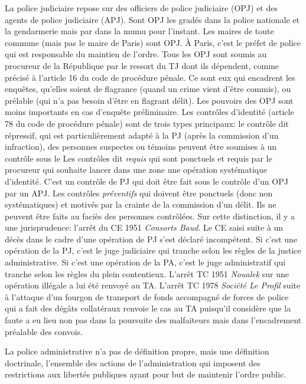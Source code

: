 \documentclass[math]{cours}
\begin{document}
La police judiciaire repose sur des officiers de police judiciaire (OPJ) et des agents de police judiciaire (APJ).
Sont OPJ les gradés dans la police nationale et la gendarmerie mais par dans la mumu pour l'instant.
Les maires de toute commune (mais pas le maire de Paris) sont OPJ. À Paris, c'est le préfet de police qui est responsable du maintien de l'ordre.
Tous les OPJ sont soumis au procureur de la République par le ressort du TJ dont ils dépendent, comme précisé à l'article 16 du code de procédure pénale.
Ce sont eux qui encadrent les enquêtes, qu'elles soient de flagrance (quand un crime vient d'être commis), ou prélable (qui n'a pas besoin d'être en flagrant délit).
Les pouvoirs des OPJ sont moins importants en cas d'enquête préliminaire.
Les contrôles d'identité (article 78 du code de procédure pénale) sont de trois types principaux: le contrôle dit répressif, qui est particulièrement adapté à la PJ (après la commission d'un infraction), des personnes suspectes ou témoins peuvent être soumises à un contrôle sous le
Les contrôles dit \emph{requis} qui sont ponctuels et requis par le procureur qui souhaite lancer dans une zone une opération systématique d'identité. C'est un contrôle de PJ qui doit être fait sous le contrôle d'un OPJ par un APJ.
Les contrôles \emph{préventifs} qui doivent être ponctuels (donc non systématiques) et motivés par la crainte de la commission d'un délit. Ils ne peuvent être faits au faciès des personnes contrôlées.
Sur cette distinction, il y a une jurisprudence: l'arrêt du CE 1951 \emph{Consorts Baud}.
Le CE saisi suite à un décès dans le cadre d'une opération de PJ s'est déclaré incompétent.
Si c'est une opération de la PJ, c'est le juge judiciaire qui tranche selon les règles de la justice administrative.
Si c'est une opération de la PA, c'est le juge administratif qui tranche selon les règles du plein contentieux.
L'arrêt TC 1951 \emph{Noualek} sur une opération illégale a lui été renvoyé au TA.
L'arrêt TC 1978 \emph{Société \emph{Le Profil}} suite à l'attaque d'un fourgon de transport de fonds accompagné de forces de police qui a fait des dégâts collatéraux renvoie le cas au TA puisqu'il considère que la faute a eu lieu non pas dans la poursuite des malfaiteurs mais dans l'encadrement préalable des convois.

La police administrative n'a pas de définition propre, mais une définition doctrinale, l'ensemble des actions de l'administration qui imposent des restrictions aux libertés publiques ayant pour but de maintenir l'ordre public.
\end{document}
